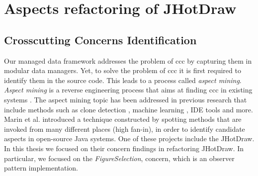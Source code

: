 
\chapter{Aspects refactoring of JHotDraw}\label{AspectRefactoring}

\section{Crosscutting Concerns Identification}
Our managed data framework addresses the problem of \ac{ccc} by capturing them in modular data managers.
Yet, to solve the problem of \ac{ccc} it is first required to identify them in the source code.
This leads to a process called \textit{aspect mining}.
\textit{Aspect mining} is a reverse engineering process that aims at finding \ac{ccc} in existing systems \cite{marin2004identifying}.
The aspect mining topic has been addressed in previous research that include methods such as clone detection \cite{bruntink2005use}, machine learning \cite{shepherd2004design}, IDE tools \cite{robillard2002concern} and more. 
Marin et al. \cite{marin2004identifying} introduced a technique constructed by spotting methods that are invoked from many different places (high fan-in), in order to identify candidate aspects in open-source Java systems.
One of these projects include the JHotDraw.
In this thesis we focused on their concern findings in refactoring JHotDraw.
In particular, we focused on the \textit{FigureSelection}, concern, which is an observer pattern implementation.

